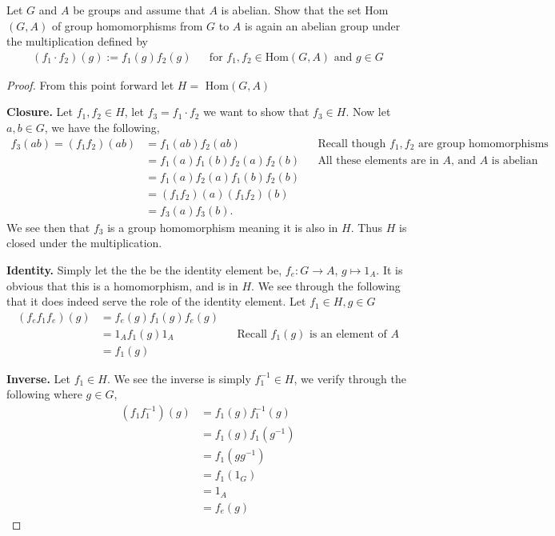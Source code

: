 \documentclass[10pt]{article}
\newenvironment{problem}[2][Problem\!]{\begin{trivlist}
\item[\hskip \labelsep {\bfseries #1}\hskip \labelsep {\bfseries #2.}]}{\end{trivlist}}
\begin{document}
\begin{tcolorbox}
    \begin{problem}{2.9}
        Let $G$ and $A$ be groups and assume that $A$ is abelian. Show that the set Hom$(G,A)$ of group homomorphisms from $G$ to $A$ is again an abelian group under the multiplication defined by
        \begin{align*}
            (f_1 \cdot f_2)(g):= f_1(g)f_2(g) && \text{for } f_1,f_2 \in \text{Hom}(G,A) \text{ and } g\in G 
        \end{align*}
    \end{problem}
\end{tcolorbox}
\begin{proof} From this point forward let $H = $ Hom$(G,A)$

    \textbf{Closure.} Let $f_1,f_2 \in H$, let $f_3 = f_1 \cdot f_2$ we want to show that $f_3 \in H$. Now let $a,b \in G$, we have the following,
    \begin{align*}
        f_3(ab) = (f_1f_2)(ab) &= f_1(ab)f_2(ab) && \text{Recall though $f_1,f_2$ are group homomorphisms} \\
        &= f_1(a)f_1(b)f_2(a)f_2(b) && \text{All these elements are in $A$, and $A$ is abelian} \\
        &= f_1(a)f_2(a)f_1(b)f_2(b)  \\
        &= (f_1f_2)(a)(f_1f_2)(b) \\
        &= f_3(a)f_3(b).
    \end{align*} 
    We see then that $f_3$ is a group homomorphism meaning it is also in $H$. Thus $H$ is closed under the multiplication.

    \textbf{Identity.} Simply let the the be the identity element be, $f_e: G\to A$, $g \mapsto 1_A$. It is obvious that this is a homomorphism, and is in $H$. We see through the following that it does indeed serve the role of the identity element. Let $f_1\in H, g \in G$
    \begin{align*}
        (f_ef_1f_e)(g) &= f_e(g)f_1(g)f_e(g) \\
        &= 1_A f_1(g) 1_A && \text{Recall $f_1(g)$ is an element of $A$} \\
        &= f_1(g)
    \end{align*}

    \textbf{Inverse.} Let $f_1\in H$. We see the inverse is simply $f_1^{-1}\in H$, we verify through the following where $g\in G$,
    \begin{align*}
        (f_1f_1^{-1})(g) &= f_1(g)f_1^{-1}(g) \\
        &= f_1(g)f_1(g^{-1}) \\
        &= f_1(gg^{-1}) \\
        &= f_1(1_G) \\
        &= 1_A \\
        &= f_e(g)
    \end{align*}
    \newpage


\end{proof}
\end{document}
